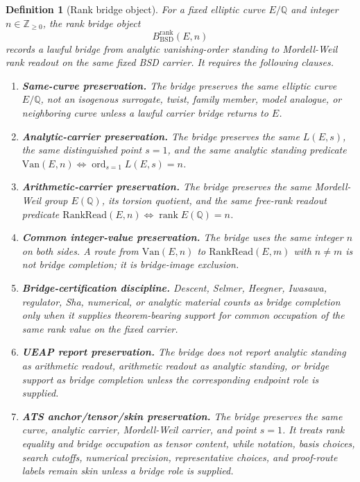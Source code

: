 \documentclass[11pt]{article}
\newtheorem{definition}[theorem]{Definition}
\newcommand{\Q}{\mathbb{Q}}
\newcommand{\Z}{\mathbb{Z}}
\newcommand{\rank}{\operatorname{rank}}
\newcommand{\ord}{\operatorname{ord}}
\newcommand{\BSD}{\mathrm{BSD}}
\newcommand{\Van}{\mathrm{Van}}
\newcommand{\RankRead}{\mathrm{RankRead}}
\newcommand{\BsdRankBridge}{B^{\mathrm{rank}}_{\BSD}}
\begin{document}
\begin{definition}[Rank bridge object]\label{def:rank-bridge-object}
For a fixed elliptic curve $E/\Q$ and integer $n\in\Z_{\ge0}$, the rank bridge object
\[
\BsdRankBridge(E,n)
\]
records a lawful bridge from analytic vanishing-order standing to Mordell-Weil rank readout on the same fixed BSD carrier. It requires the following clauses.
\begin{enumerate}[label=\textbf{B\arabic*.},leftmargin=3.2em]
\item \textbf{Same-curve preservation.} The bridge preserves the same elliptic curve $E/\Q$, not an isogenous surrogate, twist, family member, model analogue, or neighboring curve unless a lawful carrier bridge returns to $E$.
\item \textbf{Analytic-carrier preservation.} The bridge preserves the same $L(E,s)$, the same distinguished point $s=1$, and the same analytic standing predicate $\Van(E,n)\Longleftrightarrow \ord_{s=1}L(E,s)=n$.
\item \textbf{Arithmetic-carrier preservation.} The bridge preserves the same Mordell-Weil group $E(\Q)$, its torsion quotient, and the same free-rank readout predicate $\RankRead(E,n)\Longleftrightarrow \rank E(\Q)=n$.
\item \textbf{Common integer-value preservation.} The bridge uses the same integer $n$ on both sides. A route from $\Van(E,n)$ to $\RankRead(E,m)$ with $n\neq m$ is not bridge completion; it is bridge-image exclusion.
\item \textbf{Bridge-certification discipline.} Descent, Selmer, Heegner, Iwasawa, regulator, Sha, numerical, or analytic material counts as bridge completion only when it supplies theorem-bearing support for common occupation of the same rank value on the fixed carrier.
\item \textbf{UEAP report preservation.} The bridge does not report analytic standing as arithmetic readout, arithmetic readout as analytic standing, or bridge support as bridge completion unless the corresponding endpoint role is supplied.
\item \textbf{ATS anchor/tensor/skin preservation.} The bridge preserves the same curve, analytic carrier, Mordell-Weil carrier, and point $s=1$. It treats rank equality and bridge occupation as tensor content, while notation, basis choices, search cutoffs, numerical precision, representative choices, and proof-route labels remain skin unless a bridge role is supplied.
\end{enumerate}
\end{definition}
\end{document}
